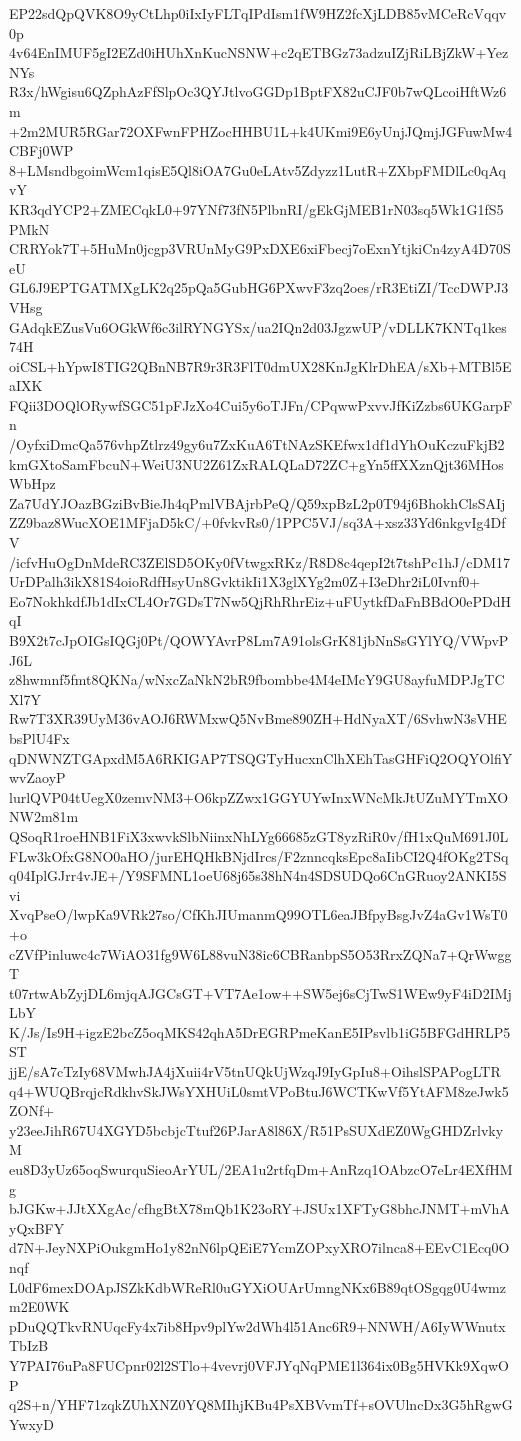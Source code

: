 EP22sdQpQVK8O9yCtLhp0iIxIyFLTqIPdIsm1fW9HZ2fcXjLDB85vMCeRcVqqv0p
4v64EnIMUF5gI2EZd0iHUhXnKucNSNW+c2qETBGz73adzuIZjRiLBjZkW+YezNYs
R3x/hWgisu6QZphAzFfSlpOc3QYJtlvoGGDp1BptFX82uCJF0b7wQLcoiHftWz6m
+2m2MUR5RGar72OXFwnFPHZocHHBU1L+k4UKmi9E6yUnjJQmjJGFuwMw4CBFj0WP
8+LMsndbgoimWcm1qisE5Ql8iOA7Gu0eLAtv5Zdyzz1LutR+ZXbpFMDlLc0qAqvY
KR3qdYCP2+ZMECqkL0+97YNf73fN5PlbnRI/gEkGjMEB1rN03sq5Wk1G1fS5PMkN
CRRYok7T+5HuMn0jcgp3VRUnMyG9PxDXE6xiFbecj7oExnYtjkiCn4zyA4D70SeU
GL6J9EPTGATMXgLK2q25pQa5GubHG6PXwvF3zq2oes/rR3EtiZI/TccDWPJ3VHsg
GAdqkEZusVu6OGkWf6c3ilRYNGYSx/ua2IQn2d03JgzwUP/vDLLK7KNTq1kes74H
oiCSL+hYpwI8TIG2QBnNB7R9r3R3FlT0dmUX28KnJgKlrDhEA/sXb+MTBl5EaIXK
FQii3DOQlORywfSGC51pFJzXo4Cui5y6oTJFn/CPqwwPxvvJfKiZzbs6UKGarpFn
/OyfxiDmcQa576vhpZtlrz49gy6u7ZxKuA6TtNAzSKEfwx1df1dYhOuKczuFkjB2
kmGXtoSamFbcuN+WeiU3NU2Z61ZxRALQLaD72ZC+gYn5ffXXznQjt36MHosWbHpz
Za7UdYJOazBGziBvBieJh4qPmlVBAjrbPeQ/Q59xpBzL2p0T94j6BhokhClsSAIj
ZZ9baz8WucXOE1MFjaD5kC/+0fvkvRs0/1PPC5VJ/sq3A+xsz33Yd6nkgvIg4DfV
/icfvHuOgDnMdeRC3ZElSD5OKy0fVtwgxRKz/R8D8c4qepI2t7tshPc1hJ/cDM17
UrDPalh3ikX81S4oioRdfHsyUn8GvktikIi1X3glXYg2m0Z+I3eDhr2iL0Ivnf0+
Eo7NokhkdfJb1dIxCL4Or7GDsT7Nw5QjRhRhrEiz+uFUytkfDaFnBBdO0ePDdHqI
B9X2t7cJpOIGsIQGj0Pt/QOWYAvrP8Lm7A91olsGrK81jbNnSsGYlYQ/VWpvPJ6L
z8hwmnf5fmt8QKNa/wNxcZaNkN2bR9fbombbe4M4eIMcY9GU8ayfuMDPJgTCXl7Y
Rw7T3XR39UyM36vAOJ6RWMxwQ5NvBme890ZH+HdNyaXT/6SvhwN3sVHEbsPlU4Fx
qDNWNZTGApxdM5A6RKIGAP7TSQGTyHucxnClhXEhTasGHFiQ2OQYOlfiYwvZaoyP
lurlQVP04tUegX0zemvNM3+O6kpZZwx1GGYUYwInxWNcMkJtUZuMYTmXONW2m81m
QSoqR1roeHNB1FiX3xwvkSlbNiinxNhLYg66685zGT8yzRiR0v/fH1xQuM691J0L
FLw3kOfxG8NO0aHO/jurEHQHkBNjdIrcs/F2znncqksEpc8aIibCI2Q4fOKg2TSq
q04IplGJrr4vJE+/Y9SFMNL1oeU68j65s38hN4n4SDSUDQo6CnGRuoy2ANKI5Svi
XvqPseO/lwpKa9VRk27so/CfKhJIUmanmQ99OTL6eaJBfpyBsgJvZ4aGv1WsT0+o
cZVfPinluwc4c7WiAO31fg9W6L88vuN38ic6CBRanbpS5O53RrxZQNa7+QrWwggT
t07rtwAbZyjDL6mjqAJGCsGT+VT7Ae1ow++SW5ej6sCjTwS1WEw9yF4iD2IMjLbY
K/Js/Is9H+igzE2bcZ5oqMKS42qhA5DrEGRPmeKanE5IPsvlb1iG5BFGdHRLP5ST
jjE/sA7cTzIy68VMwhJA4jXuii4rV5tnUQkUjWzqJ9IyGpIu8+OihslSPAPogLTR
q4+WUQBrqjcRdkhvSkJWsYXHUiL0smtVPoBtuJ6WCTKwVf5YtAFM8zeJwk5ZONf+
y23eeJihR67U4XGYD5bcbjcTtuf26PJarA8l86X/R51PsSUXdEZ0WgGHDZrlvkyM
eu8D3yUz65oqSwurquSieoArYUL/2EA1u2rtfqDm+AnRzq1OAbzcO7eLr4EXfHMg
bJGKw+JJtXXgAc/cfhgBtX78mQb1K23oRY+JSUx1XFTyG8bhcJNMT+mVhAyQxBFY
d7N+JeyNXPiOukgmHo1y82nN6lpQEiE7YcmZOPxyXRO7ilnca8+EEvC1Ecq0Onqf
L0dF6mexDOApJSZkKdbWReRl0uGYXiOUArUmngNKx6B89qtOSgqg0U4wmzm2E0WK
pDuQQTkvRNUqcFy4x7ib8Hpv9plYw2dWh4l51Anc6R9+NNWH/A6IyWWnutxTbIzB
Y7PAI76uPa8FUCpnr02l2STlo+4vevrj0VFJYqNqPME1l364ix0Bg5HVKk9XqwOP
q2S+n/YHF71zqkZUhXNZ0YQ8MIhjKBu4PsXBVvmTf+sOVUlncDx3G5hRgwGYwxyD
